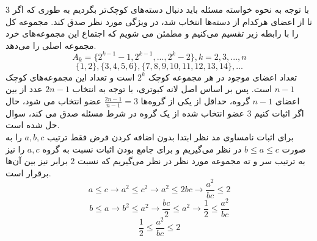 \p
با توجه به نحوه خواسته مسئله باید دنبال دسته‌های کوچک‌تر بگردیم به طوری که اگر
$3$ 
 تا از اعضای هرکدام از دسته‌ها انتخاب شد، در ویژگی مورد نظر صدق کند. مجموعه کل را با رابطه زیر تقسیم می‌کنیم و مطمئن می شویم که اجتماع این مجموعه‌های خرد مجموعه اصلی را می‌دهد.
    \[A_k = \{2^{k-1}-1,2^{k-1},...,2^{k}-2\} , k=2,3,...,n\]
    \[\{1,2\}, \{3,4,5,6\}, \{7,8,9,10,11,12,13,14\}, ...\]
    تعداد اعضای موجود در هر مجموعه کوچک \(2^k\) است و تعداد این مجموعه‌های کوچک
$n-1$ 
    است. پس بر اساس اصل لانه کبوتری، با توجه به انتخاب
$2n-1$ 
    عدد از بین اعضای
$n-1$ 
    گروه، حداقل از یکی از گروه‌ها 
    \(\frac{2n-1}{n-1} = 3\) 
    عضو انتخاب می شود، حال اگر اثبات کنیم
$3$ 
     عضو انتخاب شده از یک گروه در شرط مسئله صدق می کند، سوال حل شده است.\\
    برای اثبات نامساوی مد نظر ابتدا بدون اضافه کردن فرض فقط ترتیب
$a, b, c$
      را به صورت
  \(b\leq a\leq c\)
   در نظر می‌گیریم و برای جامع بودن اثبات نسبت به گروه
$a, c$
   را نیز به ترتیب سر و ته مجموعه مورد نظر در نظر می‌گیریم که نسبت
$2$
       برابر نیز بین آن‌ها برقرار است.
    \[a\leq c \to a^2\leq c^2 \to a^2\leq 2bc \to \frac{a^2}{bc}\leq 2\]
    \[b\leq a \to b^2\leq a^2 \to \frac{bc}{2}\leq a^2 \to \frac{1}{2}\leq\frac{a^2}{bc}\]
    \[\frac{1}{2}\leq\frac{a^2}{bc}\leq2\]
